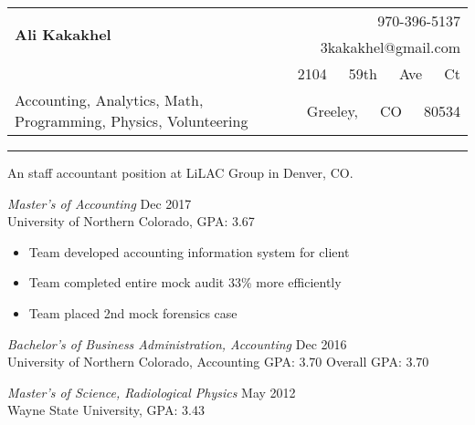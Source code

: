 \documentclass[10pt]{article}
\begin{document}
%
%
\hspace{-.8cm}
\begin{tabular}{lr}
\multirow{2}{15.2cm}{\Huge\bfseries Ali Kakakhel}              & 970-396-5137                    \\
                                                                & 3kakakhel@gmail.com             \\
                                                                & 2104\ \ \ 59th\ \ \ Ave\ \ \ Ct \\
Accounting, Analytics, Math, Programming, Physics, Volunteering & Greeley,\ \ \ CO\ \ \ 80534     \\
\end{tabular}
\rule{196mm}{0.5pt}

%
%
\begin{description}[leftmargin=!,labelwidth=3cm,align=left,itemsep=-9px,partopsep=-5px]

%
%
\item[Objective]
    An staff accountant position at LiLAC Group in Denver, CO.
\item[\rule{196mm}{0.5pt}]
%
%
\item[Education]
    \textit{Master's of Accounting} \hfill Dec 2017\\
    University of Northern Colorado, GPA: 3.67
    \begin{itemize}[rightmargin=2cm,noitemsep]%
        \item Team developed accounting information system for client
        \item Team completed entire mock audit 33\% more efficiently
        \item Team placed 2nd mock forensics case
    \end{itemize}

    \textit{Bachelor's of Business Administration, Accounting} \hfill Dec 2016\\
    University of Northern Colorado, Accounting GPA: 3.70 \quad Overall GPA: 3.70

    \textit{Master's of Science, Radiological Physics} \hfill May 2012\\
    Wayne State University, GPA: 3.43


\end{description}
\end{document}

